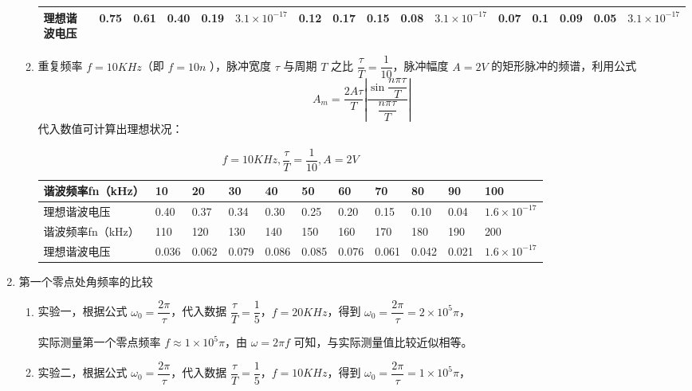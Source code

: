 \documentclass[dvipsnames, svgnames,a4paper,11pt]{article}
\begin{document}
\begin{enumerate}
\begin{enumerate}
\begin{table}[htbp]
\begin{tabularx}{\textwidth}{|p{}|X|X|X|X|X|X|X|X|X|X|X|X|X|X|X|}
              \hline
              理想谐波电压 & 0.75 & 0.61 & 0.40 & 0.19 & $3.1 \times 10^{-17}$ & 0.12 & 0.17 & 0.15 & 0.08 & $3.1 \times 10^{-17}$ & 0.07 & 0.1 & 0.09 & 0.05 & $3.1 \times 10^{-17}$\\
              \hline
            \end{tabularx}
          \end{table}
        \item 重复频率 $f = 10KHz$（即 $f = 10n$ ），脉冲宽度 $\tau$ 与周期 $T$ 之比 $\dfrac{\tau}{T} = \dfrac{1}{10}$，脉冲幅度 $A = 2V$ 的矩形脉冲的频谱，利用公式
          \begin{equation*}
            A_m = \dfrac{2A\tau}{T}\left |\dfrac{\sin \dfrac{n\pi\tau}{T}}{\dfrac{n\pi\tau}{T}} \right |
          \end{equation*}
          代入数值可计算出理想状况：
          \begin{table}[htbp]
            \renewcommand\arraystretch{1.7}
            \centering
            \caption{$f = 10KHz, \dfrac{\tau}{T} = \dfrac{1}{10}, A = 2V$}
            \begin{tabularx}{\textwidth}{|p{}|X|X|X|X|X|X|X|X|X|X|}
              \hline
              谐波频率fn（kHz） & 10 & 20 & 30 & 40 & 50 & 60 & 70 & 80 & 90 & 100 \\
              \hline
              理想谐波电压 & 0.40 & 0.37 & 0.34 & 0.30 & 0.25 & 0.20 & 0.15 & 0.10 & 0.04	& $1.6 \times 10^{-17}$	\\
              \hline
              谐波频率fn（kHz） & 110 & 120 & 130 & 140 & 150 & 160 & 170 & 180 & 190 & 200 \\
              \hline
              理想谐波电压 & 0.036 & 0.062 & 0.079 & 0.086 & 0.085 & 0.076 & 0.061 & 0.042 & 0.021 & $1.6 \times 10^{-17}$\\
              \hline
            \end{tabularx}
          \end{table}
      \end{enumerate}
    \item 第一个零点处角频率的比较
      \begin{enumerate}
        \item 实验一，根据公式 $\omega_0 = \dfrac{2\pi}{\tau}$，代入数据 $\dfrac{\tau}{T} = \dfrac{1}{5}$，$f = 20KHz$，得到 $\omega_0 = \dfrac{2\pi}{\tau} = 2 \times 10^5 \pi$，
        
          实际测量第一个零点频率 $f \approx 1 \times 10^5 \pi$，由 $\omega = 2\pi f$ 可知，与实际测量值比较近似相等。
        \item 实验二，根据公式 $\omega_0 = \dfrac{2\pi}{\tau}$，代入数据 $\dfrac{\tau}{T} = \dfrac{1}{5}$，$f = 10KHz$，得到 $\omega_0 = \dfrac{2\pi}{\tau} = 1 \times 10^5 \pi$，
        

\end{enumerate}
\end{enumerate}
\end{document}
